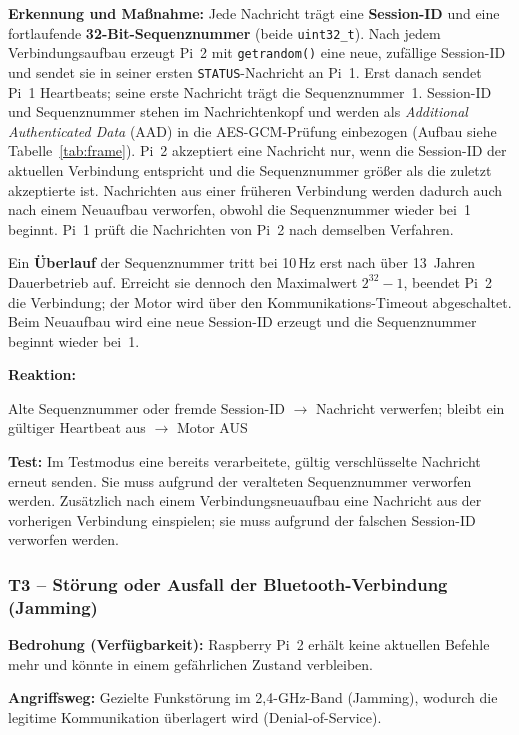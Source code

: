 \textbf{Erkennung und Maßnahme:} Jede Nachricht trägt eine \textbf{Session-ID} und
eine fortlaufende \textbf{32-Bit-Sequenznummer} (beide \texttt{uint32\_t}). Nach jedem
Verbindungsaufbau erzeugt Pi~2 mit \texttt{getrandom()} eine neue, zufällige
Session-ID und sendet sie in seiner ersten \texttt{STATUS}-Nachricht an Pi~1. Erst
danach sendet Pi~1 Heartbeats; seine erste Nachricht trägt die Sequenznummer~1.
Session-ID und Sequenznummer stehen im Nachrichtenkopf und werden als
\textit{Additional Authenticated Data} (AAD) in die AES-GCM-Prüfung einbezogen
(Aufbau siehe Tabelle~\ref{tab:frame}). Pi~2 akzeptiert eine Nachricht nur, wenn
die Session-ID der aktuellen Verbindung entspricht und die Sequenznummer größer
als die zuletzt akzeptierte ist. Nachrichten aus einer früheren Verbindung werden
dadurch auch nach einem Neuaufbau verworfen, obwohl die Sequenznummer wieder
bei~1 beginnt. Pi~1 prüft die Nachrichten von Pi~2 nach demselben Verfahren.

Ein \textbf{Überlauf} der Sequenznummer tritt bei 10\,Hz erst nach über 13~Jahren
Dauerbetrieb auf. Erreicht sie dennoch den Maximalwert $2^{32}-1$, beendet Pi~2
die Verbindung; der Motor wird über den Kommunikations-Timeout abgeschaltet. Beim
Neuaufbau wird eine neue Session-ID erzeugt und die Sequenznummer beginnt wieder
bei~1.

\textbf{Reaktion:}
\begin{center}
     Alte Sequenznummer oder fremde Session-ID $\rightarrow$ Nachricht verwerfen; bleibt ein gültiger Heartbeat aus $\rightarrow$ Motor AUS
\end{center}

\textbf{Test:} Im Testmodus eine bereits verarbeitete, gültig verschlüsselte
Nachricht erneut senden. Sie muss aufgrund der veralteten Sequenznummer
verworfen werden. Zusätzlich nach einem Verbindungsneuaufbau eine Nachricht aus
der vorherigen Verbindung einspielen; sie muss aufgrund der falschen Session-ID
verworfen werden.

\subsubsection*{T3 -- Störung oder Ausfall der Bluetooth-Verbindung (Jamming)}

\textbf{Bedrohung (Verfügbarkeit):} Raspberry Pi~2 erhält keine aktuellen
Befehle mehr und könnte in einem gefährlichen Zustand verbleiben.

\textbf{Angriffsweg:} Gezielte Funkstörung im 2,4-GHz-Band (Jamming), wodurch
die legitime Kommunikation überlagert wird (Denial-of-Service).

